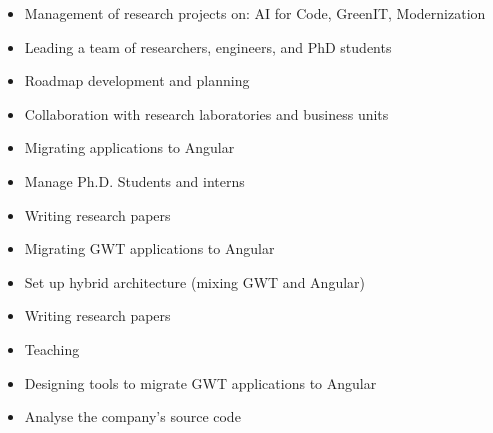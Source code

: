 \documentclass[10pt,a4paper,ragged2e,withhyper]{altacv}
\begin{document}
\begin{paracol}{2}


\begin{itemize}
\item Management of research projects on: AI for Code, GreenIT, Modernization
\item Leading a team of researchers, engineers, and PhD students
\item Roadmap development and planning
\item Collaboration with research laboratories and business units
\end{itemize}

\divider


\begin{itemize}
  \item Migrating applications to Angular
  \item Manage Ph.D. Students and interns
  \item Writing research papers
\end{itemize}

\divider


\begin{itemize}
  \item Migrating GWT applications to Angular
  \item Set up hybrid architecture (mixing GWT and Angular)
  \item Writing research papers
  \item Teaching
\end{itemize}

\divider


\begin{itemize}
  \item Designing tools to migrate GWT applications to Angular
  \item Analyse the company's source code
\end{itemize}

\divider


\end{paracol}
\end{document}
